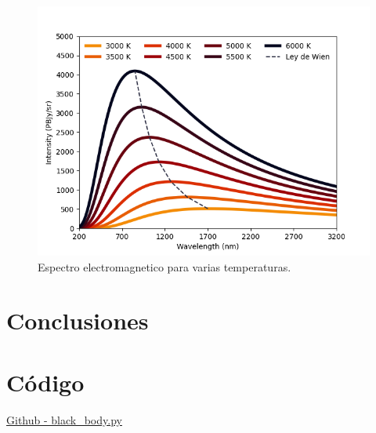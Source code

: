 \documentclass[12pt,letterpaper]{article}
\begin{document}
\begin{multicols}{2}
\begin{figure}[H]
    \includegraphics[scale=0.45]{../Graphics/black_body.png}
    \caption{Espectro electromagnetico para varias temperaturas.}
    \end{figure}
\section*{Conclusiones}


\nocite{*}
\section*{Código}
\href{https://github.com/giovannilopez9808/Notas_Agosto_2020/blob/master/AMC/Reto1/black_body.py}{Github - black\_body.py}
\end{multicols}
\end{document}
